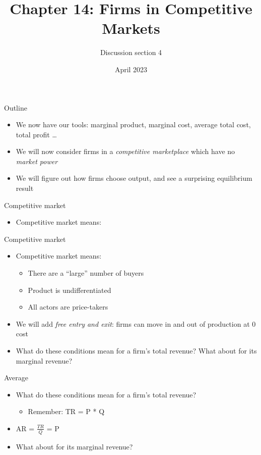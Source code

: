 \documentclass[aspectratio=169]{beamer}
\title{Chapter 14: Firms in Competitive Markets}
\author{Discussion section 4}
\date{April 2023}
\begin{document}
\begin{frame}
    \titlepage 
\end{frame}

\begin{frame}{Outline}
    \begin{itemize}
        \item We now have our tools: marginal product, marginal cost, average total cost, total profit \dots
        \item We will now consider firms in a \textit{competitive marketplace} which have no \textit{market power}
        \item We will figure out how firms choose output, and see a surprising equilibrium result
    \end{itemize}
\end{frame}

\begin{frame}{Competitive market}
    \begin{itemize}
        \item Competitive market means:
    \end{itemize}
\end{frame}

\begin{frame}{Competitive market}
    \begin{itemize}
        \item Competitive market means:
            \begin{itemize}
                \item There are a ``large'' number of buyers
                \item Product is undifferentiated
                \item All actors are price-takers
            \end{itemize}
        \item We will add \textit{free entry and exit}: firms can move in and out of production at 0 cost
        \item What do these conditions mean for a firm's total revenue? What about for its marginal revenue?
    \end{itemize}
\end{frame}

\begin{frame}{Average}
    \begin{itemize}
        \item What do these conditions mean for a firm's total revenue? 
            \begin{itemize}
                \item Remember: TR = P * Q
            \end{itemize}
        \item AR = $\frac{TR}{Q}$ = P
        \item What about for its marginal revenue? 
    \end{itemize}
\end{frame}
\end{document}
